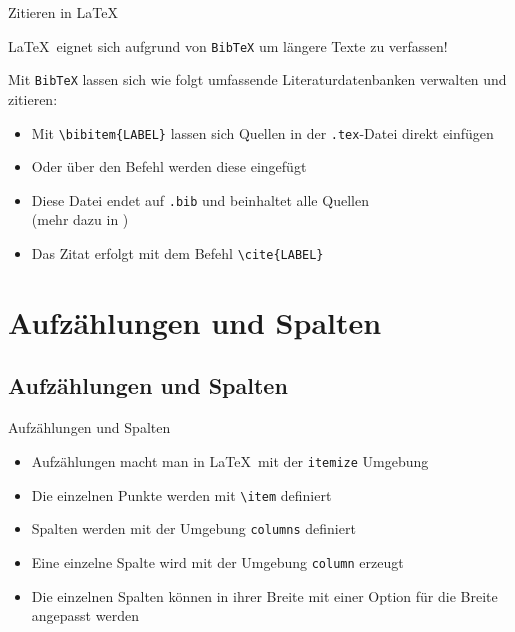 \documentclass[mathserif,serif,german]{beamer}
\begin{document}
\begin{frame}[fragile]{Zitieren in \LaTeX}
	
	\LaTeX~eignet sich aufgrund von \verb|BibTeX| um längere Texte zu verfassen!
	\vspace{12pt}
	
	Mit \verb|BibTeX| lassen sich wie folgt umfassende Literaturdatenbanken verwalten und zitieren:
	
	\begin{itemize}
		\item Mit \verb|\bibitem{LABEL}| lassen sich Quellen in der \verb|.tex|-Datei direkt einfügen
		\item Oder über den Befehl \verb|| werden diese eingefügt
		\item Diese Datei endet auf \verb|.bib| und beinhaltet alle Quellen\\(mehr dazu in \cite{Latex_Zitat})
		\item Das Zitat erfolgt mit dem Befehl \verb|\cite{LABEL}|
	\end{itemize}
	
\end{frame}	

\section{Aufzählungen und Spalten}
\subsection{Aufzählungen und Spalten}


\begin{frame}[fragile]{Aufzählungen und Spalten}
	
	\begin{itemize}
		\item Aufzählungen macht man in \LaTeX~mit der \verb|itemize| Umgebung
		\item Die einzelnen Punkte werden mit \verb|\item| definiert
		\item Spalten werden mit der Umgebung \verb|columns| definiert
		\item Eine einzelne Spalte wird mit der Umgebung \verb|column| erzeugt
		\item Die einzelnen Spalten können in ihrer Breite mit einer Option für die Breite angepasst werden
	\end{itemize}
	
\end{frame}	
\end{document}
